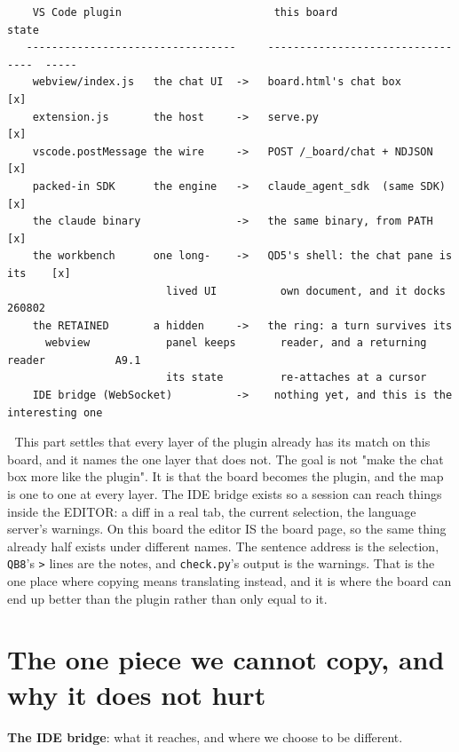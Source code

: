 \begin{verbatim}
    VS Code plugin                        this board                      state
   ---------------------------------     ---------------------------------  -----
    webview/index.js   the chat UI  ->   board.html's chat box                [x]
    extension.js       the host     ->   serve.py                             [x]
    vscode.postMessage the wire     ->   POST /_board/chat + NDJSON           [x]
    packed-in SDK      the engine   ->   claude_agent_sdk  (same SDK)         [x]
    the claude binary               ->   the same binary, from PATH           [x]
    the workbench      one long-    ->   QD5's shell: the chat pane is its    [x]
                         lived UI          own document, and it docks              260802
    the RETAINED       a hidden     ->   the ring: a turn survives its
      webview            panel keeps       reader, and a returning reader           A9.1
                         its state         re-attaches at a cursor
    IDE bridge (WebSocket)          ->    nothing yet, and this is the interesting one
\end{verbatim}
📌 This part settles that every layer of the plugin already has its match on this board, and it names the one layer that does not. The goal is not "make the chat box more like the plugin". It is that the board becomes the plugin, and the map is one to one at every layer. The IDE bridge exists so a session can reach things inside the EDITOR: a diff in a real tab, the current selection, the language server's warnings. On this board the editor IS the board page, so the same thing already half exists under different names. The sentence address is the selection, \texttt{QB8}'s \texttt{>} lines are the notes, and \texttt{check.py}'s output is the warnings. That is the one place where copying means translating instead, and it is where the board can end up better than the plugin rather than only equal to it.


\section{The one piece we cannot copy, and why it does not hurt}
\textbf{The IDE bridge}: what it reaches, and where we choose to be different.

